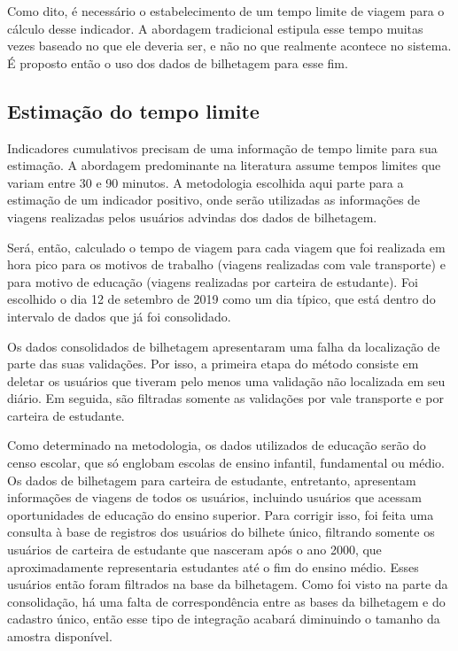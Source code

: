 \documentclass[        
    a4paper,          %
    12pt,             %
    chapter=TITLE,    %
    section=Title,    %
    subsection=Title, %
    oneside,          %
    english,          %
    spanish,          %
    brazil,           %
    fleqn             %
]{abntex2}
\begin{document}
  Como dito, é necessário o estabelecimento de um tempo limite de viagem para o cálculo desse indicador. A abordagem tradicional estipula esse tempo muitas vezes baseado no que ele deveria ser, e não no que realmente acontece no sistema. É proposto então o uso dos dados de bilhetagem para esse fim.
  
  \hypertarget{estimacao-do-tempo-limite}{%
  \subsection{Estimação do tempo limite}\label{estimacao-do-tempo-limite}}
  
  Indicadores cumulativos precisam de uma informação de tempo limite para sua estimação. A abordagem predominante na literatura assume tempos limites que variam entre 30 e 90 minutos. A metodologia escolhida aqui parte para a estimação de um indicador positivo, onde serão utilizadas as informações de viagens realizadas pelos usuários advindas dos dados de bilhetagem.
  
  Será, então, calculado o tempo de viagem para cada viagem que foi realizada em hora pico para os motivos de trabalho (viagens realizadas com vale transporte) e para motivo de educação (viagens realizadas por carteira de estudante). Foi escolhido o dia 12 de setembro de 2019 como um dia típico, que está dentro do intervalo de dados que já foi consolidado.
  
  Os dados consolidados de bilhetagem apresentaram uma falha da localização de parte das suas validações. Por isso, a primeira etapa do método consiste em deletar os usuários que tiveram pelo menos uma validação não localizada em seu diário. Em seguida, são filtradas somente as validações por vale transporte e por carteira de estudante.
  
  Como determinado na metodologia, os dados utilizados de educação serão do censo escolar, que só englobam escolas de ensino infantil, fundamental ou médio. Os dados de bilhetagem para carteira de estudante, entretanto, apresentam informações de viagens de todos os usuários, incluindo usuários que acessam oportunidades de educação do ensino superior. Para corrigir isso, foi feita uma consulta à base de registros dos usuários do bilhete único, filtrando somente os usuários de carteira de estudante que nasceram após o ano 2000, que aproximadamente representaria estudantes até o fim do ensino médio. Esses usuários então foram filtrados na base da bilhetagem. Como foi visto na parte da consolidação, há uma falta de correspondência entre as bases da bilhetagem e do cadastro único, então esse tipo de integração acabará diminuindo o tamanho da amostra disponível.
  
\end{document}
